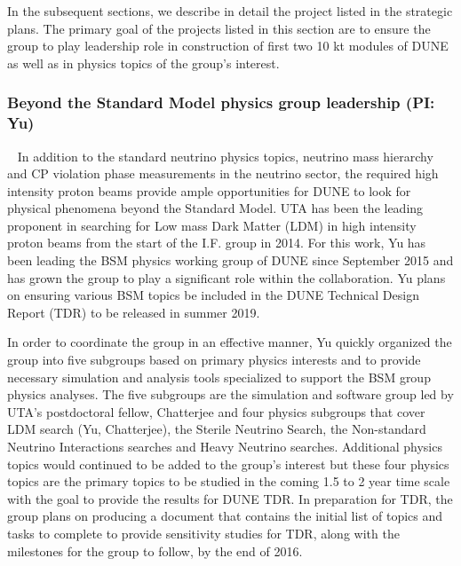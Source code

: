 In the subsequent sections, we describe in detail the project listed in the strategic plans.   The primary goal of the projects listed in this section are to ensure the group to play leadership role in construction of first two 10 kt modules of DUNE as well as in physics topics of the group's interest. 

%
%

%
%

%
%
\subsubsection {Beyond the Standard Model physics group leadership (PI: Yu)}~\label{sec:dune-bsm}
In addition to the standard neutrino physics topics, neutrino mass hierarchy and CP violation phase measurements in the neutrino sector, the required high intensity proton beams provide ample opportunities for DUNE to look for physical phenomena beyond the Standard Model. UTA has been the leading proponent in searching for Low mass Dark Matter (LDM) in high intensity proton beams from the start of the I.F. group in 2014. For this work, Yu has been leading the BSM physics working group of DUNE since September 2015 and has grown the group to play a significant role within the collaboration. Yu plans on ensuring various BSM topics be included in the DUNE Technical Design Report (TDR) to be released in summer 2019.

In order to coordinate the group in an effective manner, Yu quickly organized the group into five subgroups based on primary physics interests and to provide necessary simulation and analysis tools specialized to support the BSM group physics analyses.
The five subgroups are the simulation and software group led by UTA's postdoctoral fellow, Chatterjee and four physics subgroups that cover LDM search (Yu, Chatterjee), the Sterile Neutrino Search, the Non-standard Neutrino Interactions searches and Heavy Neutrino searches. Additional physics topics would continued to be added to the group's interest but these four physics topics are the primary topics to be studied in the coming 1.5 to 2 year time scale with the goal to provide the results for DUNE TDR.
In preparation for TDR, the group plans on producing a document that contains the initial list of topics and tasks to complete to provide
sensitivity studies for TDR, along with the milestones for the group to follow, by the end of 2016. 

